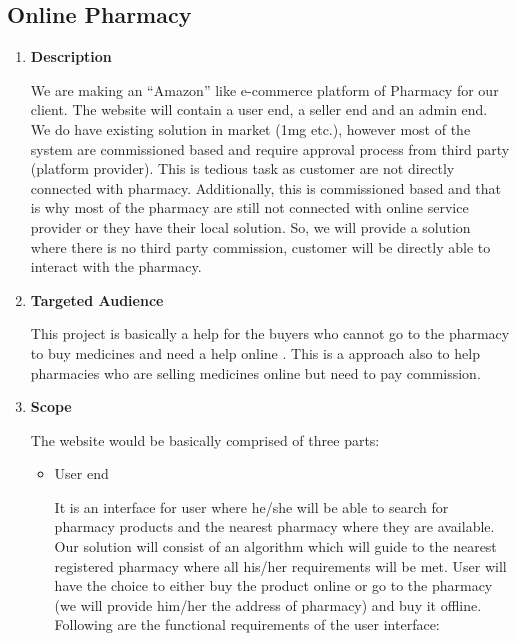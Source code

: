 \documentclass[fleqn,10pt]{../SelfArx} %
\begin{document}
\subsection{Online Pharmacy}

\vspace{0.5cm}
\begin{enumerate}
\item \textbf{Description}

We are making an “Amazon” like e-commerce platform of Pharmacy for our
client. The website will contain a user end, a seller end and an admin end. We
do have existing solution in market (1mg etc.), however most of the system are
commissioned based and require approval process from third party (platform
provider). This is tedious task as customer are not directly connected with
pharmacy. Additionally, this is commissioned based and that is why most of
the pharmacy are still not connected with online service provider or they have
their local solution. So, we will provide a solution where there is no third party
commission, customer will be directly able to interact with the pharmacy.
\item \textbf{Targeted Audience}

This project is basically a help for the buyers who cannot go to the pharmacy to buy medicines and need a help online . This is a approach also to help pharmacies who are selling medicines online but need to pay commission.

\item \textbf{Scope}

The website would be basically comprised of three parts:
\begin{itemize}
    \item User end
   
It is an interface for user where he/she will be able to search for pharmacy products and the nearest pharmacy where they are available. Our solution will consist of an algorithm which will guide to the nearest registered pharmacy where all his/her requirements will be met. User will have the choice to either buy the product online or go to the pharmacy (we will provide him/her the address of pharmacy) and buy it offline. Following are the functional requirements of the user interface:


\end{itemize}
\end{enumerate}
\end{document}
